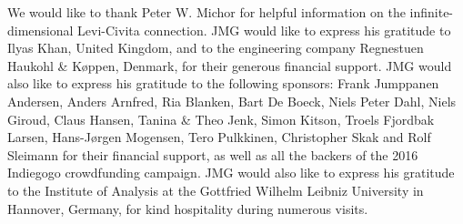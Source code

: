 \documentclass[12pt]{article}
\begin{document}
\noindent
We would like to thank Peter W. Michor for helpful information on the infinite-dimensional Levi-Civita connection.
JMG would like to express his gratitude to Ilyas Khan, United Kingdom, and to the engineering company Regnestuen Haukohl \& K\o ppen, Denmark, for their generous financial support. JMG would also like to express his gratitude to the following sponsors:  Frank Jumppanen Andersen, Anders Arnfred, Ria Blanken, Bart De Boeck, Niels Peter Dahl, Niels Giroud, Claus Hansen, Tanina \& Theo Jenk, Simon Kitson, Troels Fjordbak Larsen, Hans-J\o rgen Mogensen, Tero Pulkkinen, Christopher Skak and  Rolf Sleimann for their financial support, as well as all the backers of the 2016 Indiegogo crowdfunding campaign. JMG would also like to express his gratitude to the Institute of Analysis at the Gottfried Wilhelm Leibniz University in Hannover, Germany, for kind hospitality during numerous visits.
\end{document}
